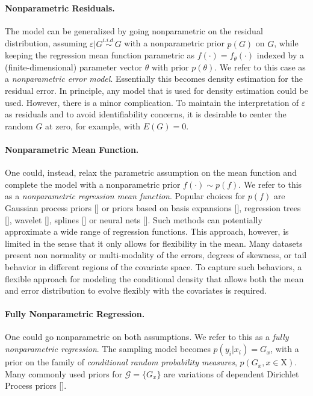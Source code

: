 \paragraph{Nonparametric Residuals.} The model can be generalized by going nonparametric on the residual distribution, assuming $\varepsilon | G \stackrel{\scriptscriptstyle i.i.d.}{\sim} G$ with a nonparametric prior $p(G)$ on $G$, while keeping the regression mean function parametric as $f(\cdot) = f_\theta(\cdot)$  indexed by a (finite-dimensional) parameter vector $\theta$ with prior $p(\theta)$. We refer to this case as a \textit{nonparametric error model}. Essentially this becomes density estimation for the residual error. In principle, any model that is used for density estimation could be used. However, there is a minor complication. To maintain the interpretation of $\varepsilon$ as residuals and to avoid identifiability concerns, it is desirable to center the random $G$ at zero, for example, with $E(G) = 0$.

\paragraph{Nonparametric Mean Function.} One could, instead, relax the parametric assumption on the mean function and complete the model with a nonparametric prior $f(\cdot) \sim p(f)$. We refer to this as a \textit{nonparametric regression mean function}. Popular choices for $p(f)$ are Gaussian process priors [\cite{Rasmussen2006}] or priors based on basis expansions [\cite{Bishop2006}], regression trees [\cite{Breiman1984}], wavelet [\cite{vidakovic2009}], splines [\cite{Hastie1990, Denison}] or neural nets [\cite{Neal1996}]. Such methods can potentially approximate a wide range of regression functions. This approach, however, is  limited in the sense that it only allows for flexibility in the mean. Many datasets present non normality or multi-modality of the errors, degrees of skewness, or tail behavior in different regions of the covariate space. To capture such behaviors, a flexible approach for modeling the conditional density that allows both the mean and error distribution to evolve flexibly with the covariates is required.
    
\paragraph{Fully Nonparametric Regression.} One could go nonparametric on both assumptions. We refer to this as a \textit{fully nonparametric regression}. The sampling model becomes $p(y_i | x_i) = G_x$, with a prior on the family of \textit{conditional random probability measures}, $p(G_x, x \in \mathrm{X})$. Many commonly used priors for $\mathcal{G} = \{G_x\}$ are variations of dependent Dirichlet Process priors [\cite{Maceachern1999}].


